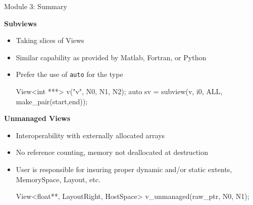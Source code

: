 \begin{frame}[fragile]{Module 3: Summary}

	\textbf{Subviews}
        \begin{itemize}
                \item Taking slices of Views
                \item Similar capability as provided by Matlab, Fortran, or Python
                \item {Prefer the use of \texttt{auto} for the type
\begin{code}[keywords={View,int,subview,ALL,make_pair}]
View<int ***> v("v", N0, N1, N2);
auto sv = subview(v, i0, ALL, make_pair(start,end));
\end{code}}
        \end{itemize}

        \vspace{10pt}
        \textbf{Unmanaged Views}
        \begin{itemize}
                \item Interoperability with externally allocated arrays
                \item No reference counting, memory not deallocated at destruction
                \item { User is responsible for insuring proper dynamic and/or static extents, MemorySpace, Layout, etc.
\begin{code}[keywords={View, float, LayoutRight, HostSpace, MemoryTraits, Unmanaged}]
View<float**, LayoutRight, HostSpace>
  v_unmanaged(raw_ptr, N0, N1);
\end{code}}
        \end{itemize}

\end{frame}

